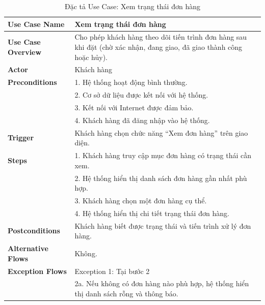 {\begin{longtable}{|>{\bfseries}p{4cm}|p{11.5cm}|}
\caption{Đặc tả Use Case: Xem trạng thái đơn hàng}
\label{tab:uc-view-order-status} \\
\hline
\textbf{Use Case Name} & Xem trạng thái đơn hàng \\
\hline
\textbf{Use Case Overview} & Cho phép khách hàng theo dõi tiến trình đơn hàng sau khi đặt (chờ xác nhận, đang giao, đã giao thành công hoặc hủy). \\
\hline
\textbf{Actor} & Khách hàng \\
\hline
\textbf{Preconditions} & 1. Hệ thống hoạt động bình thường. \\
& 2. Cơ sở dữ liệu được kết nối với hệ thống. \\
& 3. Kết nối với Internet được đảm bảo. \\
& 4. Khách hàng đã đăng nhập vào hệ thống. \\
\hline
\textbf{Trigger} & Khách hàng chọn chức năng “Xem đơn hàng” trên giao diện. \\
\hline
\textbf{Steps} & 1. Khách hàng truy cập mục đơn hàng có trạng thái cần xem. \\
& 2. Hệ thống hiển thị danh sách đơn hàng gần nhất phù hợp. \\
& 3. Khách hàng chọn một đơn hàng cụ thể. \\
& 4. Hệ thống hiển thị chi tiết trạng thái đơn hàng. \\
\hline
\textbf{Postconditions} & Khách hàng biết được trạng thái và tiến trình xử lý đơn hàng. \\
\hline
\textbf{Alternative Flows} & Không. \\
\hline
\textbf{Exception Flows} & Exception 1: Tại bước 2 \\
& 2a. Nếu không có đơn hàng nào phù hợp, hệ thống hiển thị danh sách rỗng và thông báo. \\
\hline
\end{longtable}

}
